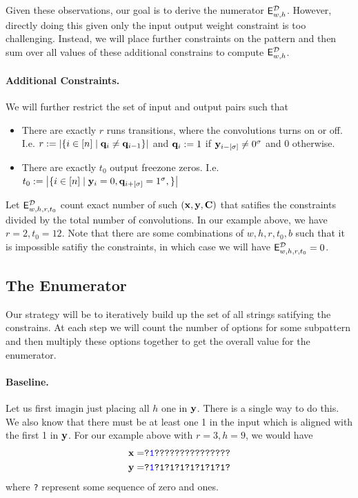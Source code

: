 Given these observations, our goal is to derive the numerator $\mathsf{E}^\mathcal{D}_{w,h}$. However, directly doing this given only the input output weight constraint is too challenging. Instead, we will place further constraints on the pattern and then sum over all values of these additional constrains to compute $\mathsf{E}^\mathcal{D}_{w,h}$. 

\paragraph{Additional Constraints.} We will further restrict the set of input and output pairs such that 
\begin{itemize}
    \item There are exactly $r$ runs transitions, where the convolutions turns on or off. I.e. $r:=\left|\{i\in [n] \mid \mathbf{q}_{i}\neq \mathbf{q}_{i-1} \}\right|$ and $\mathbf{q}_i:=1$ if $\mathbf{y}_{i-[\sigma]}\neq0^\sigma$ and 0 otherwise.
    \item There are exactly $t_0$ output freezone zeros. I.e. $t_0:=\left|\{i \in [n] \mid \mathbf{y}_i=0,\mathbf{q}_{i+[\sigma]}=1^\sigma,\}\right|$
\end{itemize}
Let $\mathsf{E}^\mathcal{D}_{w,h,r,t_0}$ count exact number of such $(\mathbf{x},\mathbf{y},\mathbf{C})$ that satifies the constraints divided by the total number of convolutions.
In our example above, we have $r=2,t_0=12$. Note that there are some combinations of $w,h,r,t_0,b$ such that it is impossible satifiy the constraints, in which case we will have $\mathsf{E}^\mathcal{D}_{w,h,r,t_0}=0$. 



\subsection{The Enumerator}

Our strategy will be to iteratively build up the set of all strings satifying the constrains. At each step we will count the number of options for some subpattern and then multiply these options together to get the overall value for the enumerator.

\paragraph{Baseline.} Let us first imagin just placing all $h$ one in $\mathbf{y}$. There is a single way to do this. We also know that there must be at least one 1 in the input which is aligned with the first 1 in $\mathbf{y}$.  For our example above with $r=3,h=9$, we would have
\begin{align*}
    \mathbf{x}=&\texttt{?\texttt{\textcolor{blue}{1}}???????????????}\\
    \mathbf{y}=&\texttt{?\texttt{\textcolor{blue}{1}}?1?1?1?1?1?1?1?}
\end{align*}
where \texttt{?} represent some sequence of zero and ones. 


